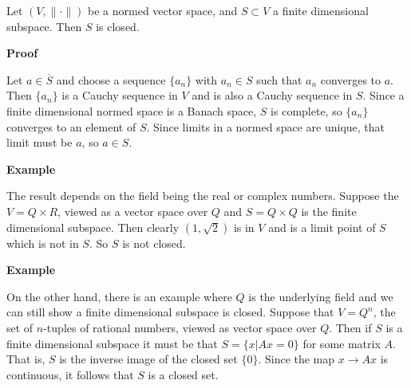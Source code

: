 \documentclass[12pt]{article}
\begin{document}
Let $(V, \| \cdot \|)$ be a  normed vector space, and $S \subset V$ a finite dimensional  subspace. Then $S$ is closed.


\textbf{Proof}

Let $a \in \overline{S} $ and choose a sequence $\{a_n\}$ with $a_n \in S$ such that
$a_n$ converges to $a$. Then $\{a_n\}$ is a Cauchy sequence in $V$ and 
is also a Cauchy sequence in $S$. Since a finite dimensional normed
space is a Banach space, $S$ is complete, so $\{a_n\}$ converges to an 
element of $S$. Since limits in a normed  space are unique, that limit
must be $a$, so $a \in S$.

\textbf{Example}

The result depends on the field being the real or complex numbers.
Suppose the $V = Q \times R$, viewed as a vector space over $Q$ and
$S = Q \times Q$ is the finite dimensional subspace. Then clearly $(1, \sqrt{2})$ is in
$V$ and is a limit point of $S$ which is not in $S$. So $S$ is not closed.

\textbf{Example}

On the other hand, there is an example where $Q$ is the underlying 
field and we can still show a finite dimensional subspace is closed.  Suppose
that $V = Q^n$, the set of $n$-tuples of rational numbers, viewed
as vector space over $Q$. Then if $S$ is a finite dimensional subspace 
it must be that $S = \{x | Ax = 0\}$ for some matrix $A$. 
That is,  $S$ is the inverse image of the closed set $\{0\}$.
Since the map $x \to Ax$ is continuous, it follows that $S$ is a closed set.


\end{document}
